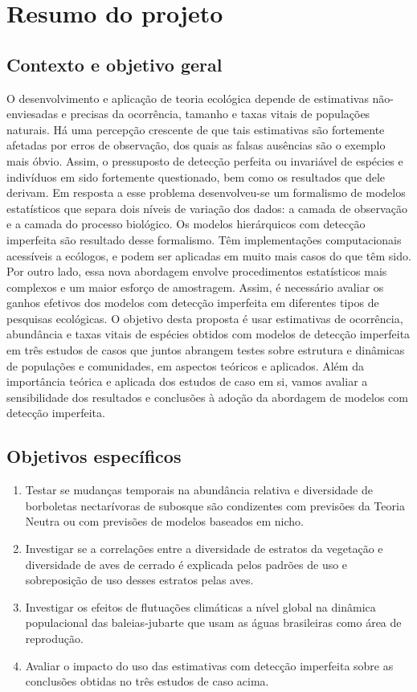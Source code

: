 \section{Resumo do projeto}


\subsection{Contexto e objetivo geral}
\label{sec:contexto} 

O desenvolvimento e aplicação de teoria ecológica depende de estimativas
não-enviesadas e precisas da ocorrência, tamanho e taxas vitais de
populações naturais. Há uma percepção crescente de que
tais estimativas são fortemente afetadas por erros de observação, dos
quais as falsas ausências são o exemplo mais óbvio. Assim, o
pressuposto de detecção perfeita ou invariável de espécies e
indivíduos em sido fortemente questionado, bem como os resultados que
dele derivam. Em resposta a esse problema desenvolveu-se um formalismo
de modelos estatísticos que separa dois níveis de
variação dos dados: a camada de observação e a camada do processo
biológico. Os  modelos hierárquicos com detecção
imperfeita são resultado desse formalismo. Têm implementações
computacionais acessíveis a ecólogos, e podem ser aplicadas em muito
mais casos do que têm sido. Por outro lado, essa nova abordagem
envolve procedimentos estatísticos mais complexos e um maior esforço
de amostragem. Assim, é necessário avaliar os ganhos efetivos dos
modelos com detecção imperfeita em diferentes tipos de pesquisas
ecológicas. O objetivo desta proposta é usar estimativas de
ocorrência, abundância e taxas vitais de espécies obtidos com modelos
de detecção imperfeita em três estudos de casos que juntos abrangem
testes sobre estrutura e dinâmicas de populações e comunidades, em
aspectos teóricos e aplicados. Além da importância teórica e aplicada
dos estudos de caso em si, vamos avaliar a sensibilidade dos
resultados e conclusões à adoção da abordagem de modelos com detecção
imperfeita.


\subsection{Objetivos específicos}
\label{sec:especificos} 

\begin{enumerate}
\item Testar se mudanças temporais na abundância relativa e
  diversidade de borboletas nectarívoras de subosque  
  são condizentes com previsões da Teoria Neutra ou com
  previsões de modelos baseados em nicho. 
\item Investigar se a correlações entre a diversidade de estratos da
  vegetação e diversidade de aves de cerrado é explicada pelos padrões
  de uso e sobreposição de uso desses estratos pelas aves.
\item Investigar os efeitos de flutuações climáticas a nível global na
  dinâmica populacional das baleias-jubarte que usam as águas
  brasileiras como área de reprodução.
\item Avaliar o impacto do uso das estimativas com detecção imperfeita
  sobre as conclusões obtidas no três estudos de caso acima.
\end{enumerate}
